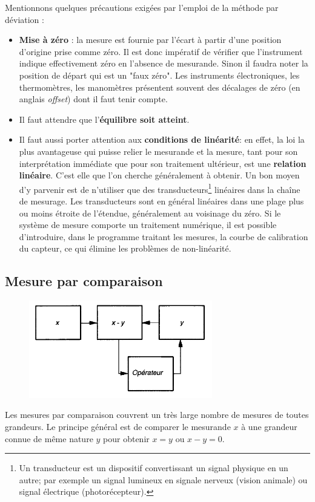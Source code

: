 Mentionnons quelques précautions exigées par l'emploi de la méthode par déviation :
\begin{itemize}
    \item\textbf{Mise à zéro} : la mesure est fournie par l'écart à partir d'une position d'origine prise comme zéro. Il est donc impératif de vérifier que l'instrument indique effectivement zéro en l'absence de mesurande. Sinon il faudra noter la position de départ qui est un "faux zéro". Les instruments électroniques, les thermomètres, les manomètres présentent souvent des décalages de zéro (en anglais \textit{offset}) dont il faut tenir compte.
    \item Il faut attendre que l'\textbf{équilibre soit atteint}.
    \item Il faut aussi porter attention aux \textbf{conditions de linéarité}: en effet, la loi la plus avantageuse qui puisse relier le mesurande et la mesure, tant pour son interprétation immédiate que pour son traitement ultérieur, est une \textbf{relation linéaire}. C'est elle que l'on cherche généralement à obtenir. Un bon moyen d'y parvenir est de n'utiliser que des transducteurs\footnote{Un transducteur est un dispositif convertissant un signal physique en un autre; par exemple un signal lumineux en signale nerveux (vision animale) ou signal électrique (photorécepteur).} linéaires dans la chaîne de mesurage. Les transducteurs sont en général linéaires dans une plage plus ou moins étroite de l'étendue, généralement au voisinage du zéro. Si le système de mesure comporte un traitement numérique, il est possible d'introduire, dans le programme traitant les mesures, la courbe de calibration du capteur, ce qui élimine les problèmes de non-linéarité.
\end{itemize}

\newpage

\subsection{Mesure par comparaison}

\begin{figure}
    \centering
    \includegraphics[width=8cm]{assets/figures/asscomp.pdf}
    \label{fig:asscomp}
\end{figure}
Les mesures par comparaison couvrent un très large nombre de mesures de toutes grandeurs. Le principe général est de comparer le mesurande $x$ à une grandeur connue de même nature $y$ pour obtenir $x=y$ ou $x-y=0$.

